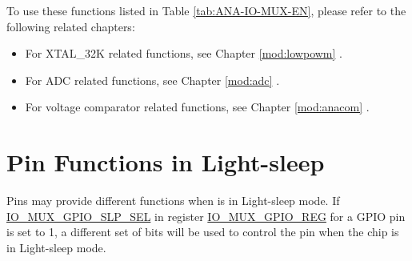 \documentclass[main\_\_EN.tex]{subfiles}
\begin{document}
To use these functions listed in Table \ref{tab:ANA-IO-MUX-EN}, please refer to the following related chapters:
\begin{itemize}
    \item For XTAL\_32K related functions, see Chapter \ref{mod:lowpowm} \textit{}.
    \item For ADC related functions, see Chapter \ref{mod:adc} \textit{}.
    \item For voltage comparator related functions, see Chapter \ref{mod:anacom} \textit{}.
\end{itemize}

\section{Pin Functions in Light-sleep}\label{sec:iomuxgpio-pin-func-light-sleep}

Pins may provide different functions when \chipname{} is in Light-sleep mode. If  \hyperref[fielddesc:IOMUXGPIONSLPSEL]{IO\_MUX\_GPIO\_SLP\_SEL} in register \hyperref[regdesc:IOMUXGPIONREG]{IO\_MUX\_GPIO\_REG} for a GPIO pin is set to 1, a different set of bits will be used to control the pin when the chip is in Light-sleep mode.
\end{document}
